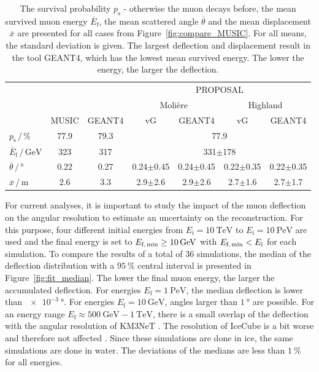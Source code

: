 \begin{table}
    \small
    \centering
    \caption{The survival probability $p_{\text{s}}$ - otherwise the muon decays before, the mean survived muon 
    energy $\overline{E}_{\text{f}}$, the mean scattered angle $\overline{\theta}$ 
    and the mean displacement $\overline{x}$ are presented for all cases from 
    Figure~\ref{fig:compare_MUSIC}. For all means, the standard deviation is given.
    The largest deflection and displacement result in the tool GEANT4, which has the lowest mean survived energy. The lower the energy, the larger the deflection.}
    \begin{tabular}{l|cc|cccc}
        \toprule
        & & & \multicolumn{4}{c}{PROPOSAL} \\
        &  & & \multicolumn{2}{c}{Molière} & \multicolumn{2}{c}{Highland} \\
        & MUSIC & GEANT4 & vG & GEANT4 & vG & GEANT4 \\
        \midrule
        $p_{\text{s}}\,/\,\si{\percent}$ & 77.9 & 79.3 &  \multicolumn{4}{c}{77.9}\\
        $\overline{E}_{\text{f}}\,/\,\si{\giga\electronvolt}$ & 323 & 317 & \multicolumn{4}{c}{331$\pm$178} \\
        $\overline{\theta}\,/\,\si{\degree}$ & 0.22 & 0.27 & 0.24$\pm$0.45 & 0.24$\pm$0.45 & 0.22$\pm$0.35 & 0.22$\pm$0.35   \\
        $\overline{x}\,/\,\si{\meter}$ & 2.6 & 3.3 & 2.9$\pm$2.6 & 2.9$\pm$2.6 & 2.7$\pm$1.6 & 2.7$\pm$1.7  \\
     \bottomrule
    \end{tabular}
    \label{tab:compare_MUSIC}
\end{table}




For current analyses, it is important to study the impact of the muon 
deflection on the angular resolution to estimate an uncertainty on the reconstruction.
For this purpose, four different initial energies 
from $E_{\text{i}} = \SI{10}{\tera\electronvolt}$ to 
$E_{\text{i}} = \SI{10}{\peta\electronvolt}$ are used and the final 
energy is set to $E_{\text{f,\,min}} \geq \SI{10}{\giga\electronvolt}$ with 
$E_{\text{f,\,min}} < E_{\text{i}}$ for each simulation. To compare the results of 
a total of $\num{36}$ simulations, the median of the deflection distribution 
with a $\SI{95}{\percent}$ central interval is presented in 
Figure~\ref{fig:fit_median}.
The lower the final muon energy, the larger the accumulated deflection. 
For energies $E_{\text{f}} = \SI{1}{\peta\electronvolt}$, the median deflection 
is lower than $\SI{e-3}{\degree}$. For energies $E_{\text{f}} = \SI{10}{\giga\electronvolt}$, 
angles larger than $\SI{1}{\degree}$ are possible. For an energy range 
$E_{\text{f}} \approx \SI{500}{\giga\electronvolt} - \SI{1}{\tera\electronvolt}$, 
there is a small overlap of the deflection with the angular resolution of KM3NeT 
\cite{KM3NeT_Resolution2016}. The resolution of IceCube is a bit worse and 
therefore not affected \cite{IceCube_Resolution2021}. Since these simulations are done 
in ice, the same simulations are done in water. The deviations of the medians
are less than $\SI{1}{\percent}$ for all energies.

